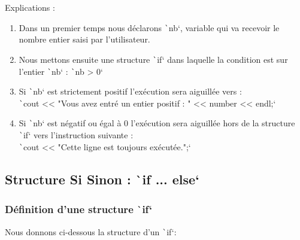 \documentclass[10pt]{article}
\begin{document}
Explications :

\begin{enumerate}
    \item Dans un premier temps nous déclarons \texttt`nb`, variable qui va recevoir le nombre entier saisi par l'utilisateur.
    \item Nous mettons ensuite une structure \texttt`if` dans laquelle la condition est sur l'entier \texttt`nb` : \texttt`nb > 0` 
    \item Si \texttt`nb` est strictement positif l'exécution sera aiguillée vers :\\
     \texttt`cout << "Vous avez entré un entier positif : " << number << endl;`
    \item Si \texttt`nb` est négatif ou égal à 0 l'exécution sera aiguillée hors de la structure \texttt`if` vers l'instruction suivante :\\
    \texttt`cout << "Cette ligne est toujours exécutée.";` 
\end{enumerate}

\subsection{Structure Si Sinon : \texttt`if ... else`}

\subsubsection{Définition d'une structure \texttt`if`}

\smallskip
Nous donnons ci-dessous la structure d'un \texttt`if`:
\end{document}
